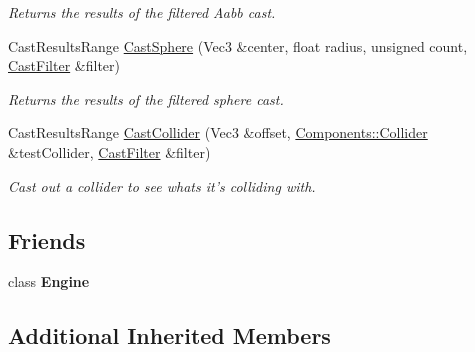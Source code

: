 \begin{DoxyCompactItemize}
\begin{DoxyCompactList}\small\item\em Returns the results of the filtered Aabb cast. \end{DoxyCompactList}\item 
Cast\-Results\-Range \hyperlink{classDCEngine_1_1Systems_1_1Physics_af47dc05f13852672453541f6ccf7a6e5}{Cast\-Sphere} (Vec3 \&center, float radius, unsigned count, \hyperlink{structDCEngine_1_1CastFilter}{Cast\-Filter} \&filter)
\begin{DoxyCompactList}\small\item\em Returns the results of the filtered sphere cast. \end{DoxyCompactList}\item 
Cast\-Results\-Range \hyperlink{classDCEngine_1_1Systems_1_1Physics_a0c0a655d338e25d5c4c120b368f26452}{Cast\-Collider} (Vec3 \&offset, \hyperlink{classDCEngine_1_1Components_1_1Collider}{Components\-::\-Collider} \&test\-Collider, \hyperlink{structDCEngine_1_1CastFilter}{Cast\-Filter} \&filter)
\begin{DoxyCompactList}\small\item\em Cast out a collider to see whats it's colliding with. \end{DoxyCompactList}\end{DoxyCompactItemize}
\subsection*{Friends}
\begin{DoxyCompactItemize}
\item 
\hypertarget{classDCEngine_1_1Systems_1_1Physics_a3e1914489e4bed4f9f23cdeab34a43dc}{class {\bfseries Engine}}\label{classDCEngine_1_1Systems_1_1Physics_a3e1914489e4bed4f9f23cdeab34a43dc}

\end{DoxyCompactItemize}
\subsection*{Additional Inherited Members}


